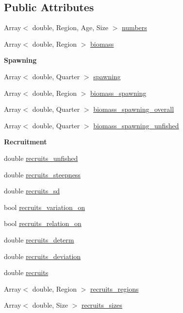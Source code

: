\subsection*{Public Attributes}
\begin{DoxyCompactItemize}
\item 
Array$<$ double, Region, Age, Size $>$ \hyperlink{classIOSKJ_1_1Model_aa90edf75b7c9ebf8e50a30f3779b9664}{numbers}
\item 
Array$<$ double, Region $>$ \hyperlink{classIOSKJ_1_1Model_a05da71e81b1a0a7ecbba4d417f4ba727}{biomass}
\end{DoxyCompactItemize}
\begin{Indent}{\bf Spawning}\par
\begin{DoxyCompactItemize}
\item 
Array$<$ double, Quarter $>$ \hyperlink{classIOSKJ_1_1Model_a81bffc6707aa313f87bf21dbbf1d8143}{spawning}
\item 
Array$<$ double, Region $>$ \hyperlink{classIOSKJ_1_1Model_ac507a33d868bbf1b74a6e098f32eb49f}{biomass\-\_\-spawning}
\item 
Array$<$ double, Quarter $>$ \hyperlink{classIOSKJ_1_1Model_a2e2376de2347bb24f9cd18c6cb6b71a5}{biomass\-\_\-spawning\-\_\-overall}
\item 
Array$<$ double, Quarter $>$ \hyperlink{classIOSKJ_1_1Model_a2fe8d9737c54dcba326f0d6d73e50d28}{biomass\-\_\-spawning\-\_\-unfished}
\end{DoxyCompactItemize}
\end{Indent}
\begin{Indent}{\bf Recruitment}\par
\begin{DoxyCompactItemize}
\item 
double \hyperlink{classIOSKJ_1_1Model_a780f4e69674141e96e028765004608ea}{recruits\-\_\-unfished}
\item 
double \hyperlink{classIOSKJ_1_1Model_ae3660f3f79edc131d7b96cf391f6a902}{recruits\-\_\-steepness}
\item 
double \hyperlink{classIOSKJ_1_1Model_aff3f79494f94a20043a0c57009129dea}{recruits\-\_\-sd}
\item 
bool \hyperlink{classIOSKJ_1_1Model_a164e3c054caea071da7079d5ff27833b}{recruits\-\_\-variation\-\_\-on}
\item 
bool \hyperlink{classIOSKJ_1_1Model_a88f9a0d53e76f9a88bf0d81c30bdb612}{recruits\-\_\-relation\-\_\-on}
\item 
double \hyperlink{classIOSKJ_1_1Model_ad2450f5604c657cbe259b7b49e8f905a}{recruits\-\_\-determ}
\item 
double \hyperlink{classIOSKJ_1_1Model_a639afa6cd0480ad8c6dbac286bdaa55c}{recruits\-\_\-deviation}
\item 
double \hyperlink{classIOSKJ_1_1Model_a8ffa15a7aea7598d5a6c91bec5779ef3}{recruits}
\item 
Array$<$ double, Region $>$ \hyperlink{classIOSKJ_1_1Model_a735f9a4288dc9fc4ca836c9ad3af3161}{recruits\-\_\-regions}
\item 
Array$<$ double, Size $>$ \hyperlink{classIOSKJ_1_1Model_a55d28db5525f6a4b0702c60dccbebd57}{recruits\-\_\-sizes}
\end{DoxyCompactItemize}
\end{Indent}
